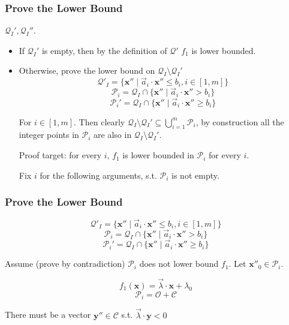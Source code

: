 \documentclass[11pt]{beamer}
\begin{document}
\begin{frame}\frametitle{Prove the Lower Bound}
$\mathcal{Q}_I', \mathcal{Q}_I''$.
\begin{itemize}
\item If $\mathcal{Q}_I'$ is empty, then by the definition of $\mathcal{Q}'$ $f_1$ is lower bounded.

\item Otherwise, prove the lower bound on $\mathcal{Q}_I \setminus \mathcal{Q}_I'$
\[\mathcal{Q}'_I = \{\textbf{x}'' \mid \vec{a}_i\cdot \textbf{x}'' \le b_i, i \in [1, m]\}\]
\[\mathcal{P}_i = \mathcal{Q}_I \cap \{\textbf{x}''\mid \vec{a}_i \cdot \textbf{x}'' > b_i\}\]
\[\mathcal{P}_i' = \mathcal{Q}_I \cap \{\textbf{x}''\mid \vec{a}_i \cdot \textbf{x}'' \ge b_i\}\]

For $i\in [1, m]$.
Then clearly $\mathcal{Q}_I\setminus \mathcal{Q}_I' \subseteq \bigcup_{i = 1}^{m} \mathcal{P}_i$, by construction all the integer points in $\mathcal{P}_i$ are also in $\mathcal{Q}_I\setminus \mathcal{Q}_I'$.

Proof target: for every $i$, $f_1$ is lower bounded in $\mathcal{P}_i$ for every $i$.

Fix $i$ for the following arguments, s.t. $\mathcal{P}_i$ is not empty.



\end{itemize}


\end{frame}


\begin{frame}
\frametitle{Prove the Lower Bound}

\[\mathcal{Q}'_I = \{\textbf{x}'' \mid \vec{a}_i\cdot \textbf{x}'' \le b_i, i \in [1, m]\}\]
\[\mathcal{P}_i = \mathcal{Q}_I \cap \{\textbf{x}''\mid \vec{a}_i \cdot \textbf{x}'' > b_i\}\]
\[\mathcal{P}_i' = \mathcal{Q}_I \cap \{\textbf{x}''\mid \vec{a}_i \cdot \textbf{x}'' \ge b_i\}\]




Assume (prove by contradiction) $\mathcal{P}_i$ does not lower bound $f_1$.
Let $\textbf{x}''_0\in \mathcal{P}_i$.

\[f_1(\textbf{x}) = \vec{\lambda}\cdot \textbf{x} + \lambda_0 \]
\[\mathcal{P}_i = \mathcal{O} + \mathcal{C}\]

There must be a vector $\textbf{y}''\in \mathcal{C}$ s.t. $\vec{\lambda}\cdot \textbf{y}  < 0$


\end{frame}
\end{document}
